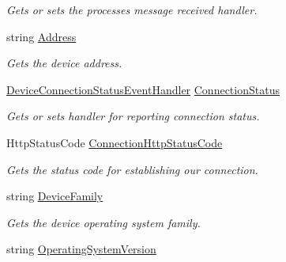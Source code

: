 \begin{DoxyCompactItemize}
\begin{DoxyCompactList}\small\item\em Gets or sets the processes message received handler. \end{DoxyCompactList}\item 
string \hyperlink{class_microsoft_1_1_tools_1_1_windows_device_portal_1_1_device_portal_a9a341e0c54d33dc0eb8085fd27e69453}{Address}
\begin{DoxyCompactList}\small\item\em Gets the device address. \end{DoxyCompactList}\item 
\hyperlink{namespace_microsoft_1_1_tools_1_1_windows_device_portal_a7cf019b0c750e52495263f4fb0df9ead}{Device\+Connection\+Status\+Event\+Handler} \hyperlink{class_microsoft_1_1_tools_1_1_windows_device_portal_1_1_device_portal_a186b90354f9e6ea7c1e49b879a8cd058}{Connection\+Status}
\begin{DoxyCompactList}\small\item\em Gets or sets handler for reporting connection status. \end{DoxyCompactList}\item 
Http\+Status\+Code \hyperlink{class_microsoft_1_1_tools_1_1_windows_device_portal_1_1_device_portal_ada521d8a432e16908386ae1882a42a16}{Connection\+Http\+Status\+Code}
\begin{DoxyCompactList}\small\item\em Gets the status code for establishing our connection. \end{DoxyCompactList}\item 
string \hyperlink{class_microsoft_1_1_tools_1_1_windows_device_portal_1_1_device_portal_ab0e688179889f2dc2c3585da28548001}{Device\+Family}
\begin{DoxyCompactList}\small\item\em Gets the device operating system family. \end{DoxyCompactList}\item 
string \hyperlink{class_microsoft_1_1_tools_1_1_windows_device_portal_1_1_device_portal_aa418a5e83647805a2f1a703da4ba78b6}{Operating\+System\+Version}

\end{DoxyCompactItemize}
